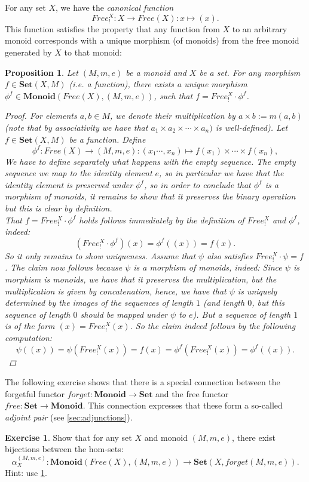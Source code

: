 \documentclass[a4paper,10pt]{scrartcl}
\theoremstyle{plain}
\newtheorem{prop}[thm]{Proposition}
\theoremstyle{definition}
\newtheorem{exer}[thm]{Exercise}
\newcommand{\Catb}[1]{\mathbf{#1}}
\newcommand{\SET}{\Catb{Set}}
\newcommand{\MON}{\Catb{Monoid}}
\newcommand{\CHom}[3]{{#1}(#2,#3)}
\newcommand{\Comp}{\cdot}
\begin{document}
For any set $X$, we have the \textit{canonical function} 
\[
Free^{X}_{!}: X\to Free(X): x\mapsto (x).
\]
This function satisfies the property that any function from $X$ to an arbitrary monoid corresponds with a unique morphism (of monoids) from the free monoid generated by $X$ to that monoid:
\begin{prop}\label{prop:UVP_forget_montoset} Let $(M,m,e)$ be a monoid and $X$ be a set. For any morphism $f \in \CHom{\SET}{X}{M}$ (i.e. a function), there exists a unique  morphism $\phi^{f} \in \CHom{\MON}{Free(X)}{(M,m,e)}$, such that $f = Free^{X}_{!}\Comp \phi^{f}$.
\begin{proof}
For elements $a,b\in M$, we denote their multiplication by $a\times b := m(a,b)$ (note that by associativity we have that $a_1\times a_2\times\cdots\times a_n)$ is well-defined). Let $f\in \CHom{\SET}{X}{M}$ be a function. Define 
\[
\phi^{f}: Free(X)\to (M,m,e): (x_1\cdots,x_n)\mapsto f(x_1) \times\cdots \times f(x_n),
\] 
We have to define separately what happens with the empty sequence. The empty sequence we map to the identity element $e$, so in particular we have that the identity element is preserved under $\phi^{f}$, so in order to conclude that $\phi^{f}$ is a morphism of monoids, it remains to show that it preserves the binary operation but this is clear by definition.\\
That $f = Free^{X}_{!}\Comp \phi^{f}$ holds follows immediately by the definition of $Free^{X}_{!}$ and $\phi^{f}$, indeed:
\[
\left(Free^{X}_{!}\Comp \phi^{f}\right)(x) = \phi^{f}\left((x)\right) = f(x).
\]
So it only remains to show uniqueness. Assume that $\psi$ also satisfies $Free^{X}_{!}\Comp \psi = f$. The claim now follows because $\psi$ is a morphism of monoids, indeed: Since $\psi$ is morphism is monoids, we have that it preserves the multiplication, but the multiplication is given by concatenation, hence, we have that $\psi$ is uniquely determined by the images of the sequences of length $1$ (and length $0$, but this sequence of length $0$ should be mapped under $\psi$ to $e$). But a sequence of length $1$ is of the form $(x) = Free^{X}_{!}(x)$. So the claim indeed follows by the following computation: 
\[
\psi((x)) = \psi(Free^{X}_{!}(x)) = f(x) = \phi^{f}(Free^{X}_{!}(x)) = \phi^{f}((x)).
\]
\end{proof}
\end{prop}

The following exercise shows that there is a special connection between the forgetful functor $\mathit{forget}: \MON\to\SET$ and the free functor $\mathit{free}: \SET\to\MON$. This connection expresses that these form a so-called \textit{adjoint pair} (see \cref{sec:adjunctions}).
\begin{exer}\label{exer:preadjunction_monset}
Show that for any set $X$ and monoid $(M,m,e)$, there exist bijections between the hom-sets:
\[
\alpha_{X}^{(M,m,e)} : \CHom{\MON}{Free(X)}{(M,m,e)} \to \CHom{\SET}{X}{forget(M,m,e)}.
\]
Hint: use \cref{prop:UVP_forget_montoset}.
\end{exer}
\end{document}

